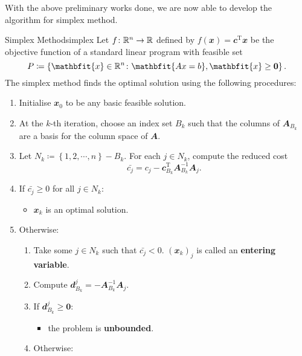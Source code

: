 \documentclass[math, code]{amznotes}
\theoremstyle{remark}
\begin{document}
With the above preliminary works done, we are now able to develop the algorithm for simplex method.
\begin{tecbox}{Simplex Method}{simplex}
    Let $f \colon \mathbb{R}^n \to \mathbb{R}$ defined by $f(\mathbfit{x}) = \mathbfit{c}^{\mathrm{T}}\mathbfit{x}$ be the objective function of a standard linear program with feasible set 
    \begin{equation*}
        P \coloneqq \left\{\mathbfit{x} \in \R^n \colon \mathbfit{Ax = b}, \mathbfit{x} \geq \mathbf{0}\right\}.
    \end{equation*}
    The simplex method finds the optimal solution using the following procedures:
    \begin{enumerate}
        \item Initialise $\mathbfit{x}_0$ to be any basic feasible solution. 
        \item At the $k$-th iteration, choose an index set $B_k$ such that the columns of $\mathbfit{A}_{B_k}$ are a basis for the column space of $\mathbfit{A}$.
        \item Let $N_k \coloneqq \left\{1, 2, \cdots, n\right\} - B_k$. For each $j \in N_k$, compute the reduced cost 
        \begin{equation*}
            \bar{c_j} = c_j - \mathbfit{c}_{B_k}^{\mathrm{T}}\mathbfit{A}_{B_k}^{-1}\mathbfit{A}_j.
        \end{equation*}
        \item If $\bar{c_j} \geq 0$ for all $j \in N_k$:
        \begin{itemize}
            \item $\mathbfit{x}_k$ is an optimal solution.
        \end{itemize}
        \item Otherwise:
        \begin{enumerate}
            \item Take some $j \in N_k$ such that $\bar{c_j} < 0$. $\left(\mathbfit{x}_{k}\right)_j$ is called an {\color{red} \textbf{entering variable}}.
            \item Compute $\mathbfit{d}^j_{B_k} = -\mathbfit{A}_{B_k}^{-1}\mathbfit{A}_j$.
            \item If $\mathbfit{d}^j_{B_k} \geq \mathbf{0}$:
            \begin{itemize}
                \item the problem is {\color{red} \textbf{unbounded}}.
            \end{itemize}
            \item Otherwise:

\end{enumerate}
\end{enumerate}
\end{tecbox}
\end{document}
